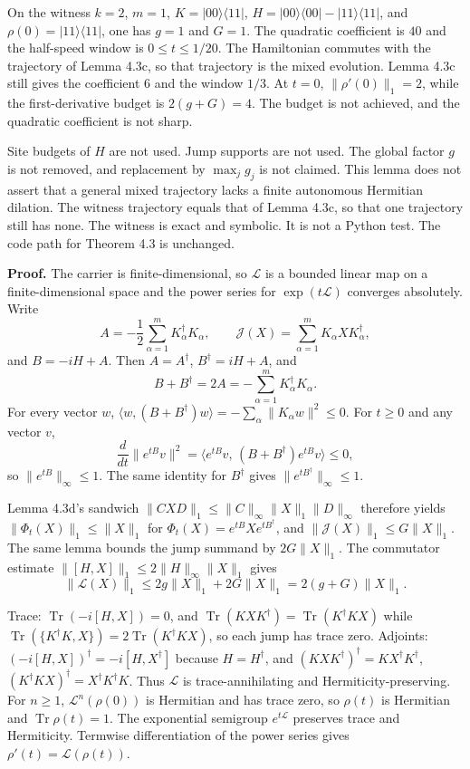 \documentclass[
  11pt,
]{article}
\begin{document}
On the witness \(k=2\), \(m=1\), \(K=|00\rangle\langle11|\),
\(H=|00\rangle\langle00|-|11\rangle\langle11|\), and
\(\rho(0)=|11\rangle\langle11|\), one has \(g=1\) and \(G=1\). The
quadratic coefficient is \(40\) and the half-speed window is
\(0\le t\le 1/20\). The Hamiltonian commutes with the trajectory of
Lemma 4.3c, so that trajectory is the mixed evolution. Lemma 4.3c
still gives the coefficient \(6\) and the window \(1/3\). At \(t=0\),
\(\|\rho'(0)\|_1=2\), while the first-derivative budget is
\(2(g+G)=4\). The budget is not achieved, and the quadratic
coefficient is not sharp.

Site budgets of \(H\) are not used. Jump supports are not used. The
global factor \(g\) is not removed, and replacement by \(\max_j g_j\)
is not claimed. This lemma does not assert that a general mixed
trajectory lacks a finite autonomous Hermitian dilation. The witness trajectory
equals that of Lemma 4.3c, so that one trajectory still has none.
The witness is exact and symbolic. It is not a Python test. The code
path for Theorem 4.3 is unchanged.

\textbf{Proof.} The carrier is finite-dimensional, so \(\mathcal L\) is a
bounded linear map on a finite-dimensional space and the power series
for \(\exp(t\mathcal L)\) converges absolutely. Write
\[
A=-\frac12\sum_{\alpha=1}^{m}K_\alpha^\dagger K_\alpha,\qquad
\mathcal J(X)=\sum_{\alpha=1}^{m}K_\alpha XK_\alpha^\dagger,
\]
and \(B=-iH+A\). Then \(A=A^\dagger\), \(B^\dagger=iH+A\), and
\[
B+B^\dagger=2A=-\sum_{\alpha=1}^{m}K_\alpha^\dagger K_\alpha.
\]
For every vector \(w\),
\(\langle w,(B+B^\dagger)w\rangle=-\sum_\alpha\|K_\alpha w\|^2\le 0\).
For \(t\ge 0\) and any vector \(v\),
\[
\frac{d}{dt}\|e^{tB}v\|^2
=\langle e^{tB}v,\,(B+B^\dagger)e^{tB}v\rangle\le 0,
\]
so \(\|e^{tB}\|_\infty\le 1\). The same identity for \(B^\dagger\) gives
\(\|e^{tB^\dagger}\|_\infty\le 1\).

Lemma 4.3d's sandwich
\(\|CXD\|_1\le\|C\|_\infty\|X\|_1\|D\|_\infty\) therefore yields
\(\|\Phi_t(X)\|_1\le\|X\|_1\) for
\(\Phi_t(X)=e^{tB}Xe^{tB^\dagger}\), and
\(\|\mathcal J(X)\|_1\le G\|X\|_1\). The same lemma bounds the jump
summand by \(2G\|X\|_1\). The commutator estimate
\(\|[H,X]\|_1\le 2\|H\|_\infty\|X\|_1\) gives
\[
\|\mathcal L(X)\|_1
\le 2g\|X\|_1+2G\|X\|_1
=2(g+G)\|X\|_1.
\]

Trace: \(\operatorname{Tr}(-i[H,X])=0\), and
\(\operatorname{Tr}(KXK^\dagger)=\operatorname{Tr}(K^\dagger KX)\) while
\(\operatorname{Tr}(\{K^\dagger K,X\})=2\operatorname{Tr}(K^\dagger KX)\),
so each jump has trace zero. Adjoints:
\((-i[H,X])^\dagger=-i[H,X^\dagger]\) because \(H=H^\dagger\), and
\((KXK^\dagger)^\dagger=KX^\dagger K^\dagger\),
\((K^\dagger KX)^\dagger=X^\dagger K^\dagger K\). Thus \(\mathcal L\)
is trace-annihilating and Hermiticity-preserving. For \(n\ge 1\),
\(\mathcal L^n(\rho(0))\) is Hermitian and has trace zero, so
\(\rho(t)\) is Hermitian and \(\operatorname{Tr}\rho(t)=1\). The exponential semigroup \(e^{t\mathcal L}\) preserves trace and Hermiticity. Termwise
differentiation of the power series gives
\(\rho'(t)=\mathcal L(\rho(t))\).
\end{document}

